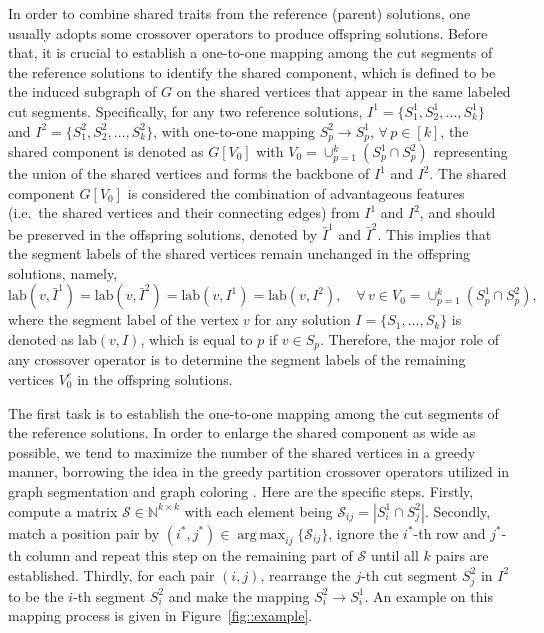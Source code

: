 \documentclass[12pt, a4paper]{article}%
\DeclareMathOperator*{\argmax}{\ensuremath{arg\,max}}
\newcommand{\labeling}{\ensuremath{\mathrm{lab}}}
\numberwithin{equation}{section}
\theoremstyle{plain}
\begin{document}
In order to combine shared traits from the reference (parent) solutions, one usually adopts some crossover operators to produce offspring solutions.
Before that, it is crucial to establish a one-to-one mapping among the cut segments of the reference solutions to identify the shared component, which is defined to be the induced subgraph of $G$ on the shared vertices that appear in the same labeled cut segments. Specifically, for any two reference solutions, $I^1=\{S_1^1,S_2^1,\ldots,S_k^1\}$ and $I^2=\{S_1^2,S_2^2,\ldots,S_k^2\}$, with one-to-one mapping $S_p^2\rightarrow S_p^1$, $\forall\,p\in[k]$, the shared component is denoted as $G[V_0]$ with $V_0=\cup_{p=1}^k(S_p^1\cap S_p^2)$ representing the union of the shared vertices and forms the backbone of $I^1$ and $I^2$. The shared component $G[V_0]$ is considered the combination of advantageous features (i.e.~the shared vertices and their connecting edges) from ${I}^1$ and ${I}^2$, and should be preserved in the offspring solutions, denoted by $\bar{I}^1$ and $\bar{I}^2$. This implies that the segment labels of the shared vertices remain unchanged in the offspring solutions, namely, 
\begin{equation}
	\label{eq:shared}
	\labeling(v,\bar{I}^1)=\labeling(v,\bar{I}^2)=\labeling(v, I^1)=\labeling(v,I^2),\quad \forall\, v\in V_0=\cup_{p=1}^k(S_p^1\cap S_p^2),
\end{equation}
where the segment label of the vertex $v$ for any solution $I=\{S_1,\ldots,S_k\}$ is denoted as $\labeling(v,I)$, which is equal to $p$ if $v\in S_p$. Therefore, the major role of any crossover operator is to determine the segment labels of the remaining vertices $V_0^c$ in the offspring solutions.

The first task is to establish the one-to-one mapping among the cut segments of the reference solutions. In order to enlarge the shared component as wide as possible, we tend to maximize the number of the shared vertices in a greedy manner, borrowing the idea in the greedy partition crossover operators utilized in graph segmentation \cite{Benlic2011partition,Wu2012} and graph coloring \cite{dorne1998new,galinier1999hybrid,hao2012memetic}. Here are the specific steps. Firstly, compute a matrix $\mathcal{S}\in\mathbb{N}^{k\times k}$ with each element being $\mathcal{S}_{ij}=|S_i^1\cap S_j^2|$. Secondly, match a position pair by $(i^*,j^*)\in\argmax_{ij}\{\mathcal{S}_{ij}\}$, 
ignore the $i^*$-th row and $j^*$-th column and repeat this step on the remaining part of $\mathcal{S}$ until all $k$ pairs are established. Thirdly, for each pair $(i,j)$, rearrange the $j$-th cut segment $S_j^2$ in $I^2$ to be the $i$-th segment $S_i^2$ and make the mapping $S_i^2\rightarrow S_i^1$. An example on this mapping process is given in Figure~\ref{fig::example}.
\end{document}
